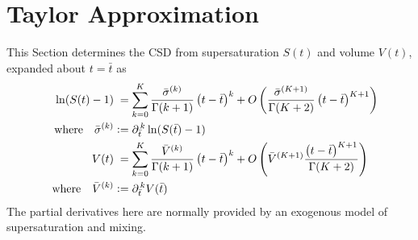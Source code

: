 \documentclass[a4paper]{base}
\begin{document}
\section{Taylor Approximation}\label{sec:Taylor}
    This Section determines the CSD from supersaturation $S(t)$ and volume $V(t)$, expanded about $t=\bar{t}$ as
    \begin{equation} \label{def:Taylor:s}
        \begin{aligned}
            \ln (S(t)-1) &\phantom{:}= \sum_{k=0}^{K} \frac{\bar{\sigma}^{(k)}}{\Gamma(k+1)} \left(t-\bar{t}\right)^{k}
                +  O \left(\frac{\bar{\sigma}^{(K+1)}}{\Gamma(K+2)}\left(t-\bar{t}\right)^{K+1}\right)\\
            \QT{where}\bar{\sigma}^{(k)} &\deq \partial_{\bar{t}}^{\,k} \ln (S(\bar{t})-1) \\
            V(t) &\phantom{:}= \sum_{k=0}^{K} \frac{\bar{V}^{(k)}}{\Gamma(k+1)} \left(t-\bar{t}\right)^{k}
                +  O \left(\bar{V}^{(K+1)} \frac{\left(t-\bar{t}\right)^{K+1}}{\Gamma(K+2)}\right)\\
            \QT{where}\bar{V}^{(k)} &\deq \partial_{\bar{t}}^{\,k} V(\bar{t})
        \end{aligned}
    \end{equation}
    The partial derivatives here are normally provided by an exogenous model of supersaturation and mixing.
\end{document}
